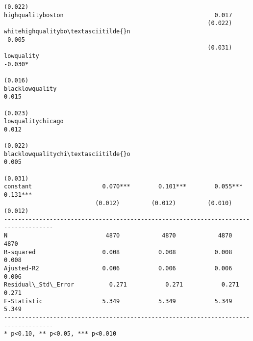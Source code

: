 \documentclass[11pt]{article}
\begin{document}
\begin{Verbatim}[commandchars=\\\{\}]
                                                          (0.022)                   
highqualityboston                                           0.017                   
                                                          (0.022)                   
whitehighqualitybo\textasciitilde{}n                                       -0.005                   
                                                          (0.031)                   
lowquality                                                                 -0.030*  
                                                                          (0.016)   
blacklowquality                                                             0.015   
                                                                          (0.023)   
lowqualitychicago                                                           0.012   
                                                                          (0.022)   
blacklowqualitychi\textasciitilde{}o                                                        0.005   
                                                                          (0.031)   
constant                    0.070***        0.101***        0.055***        0.131***
                          (0.012)         (0.012)         (0.010)         (0.012)   
------------------------------------------------------------------------------------
N                            4870            4870            4870            4870   
R-squared                   0.008           0.008           0.008           0.008   
Ajusted-R2                  0.006           0.006           0.006           0.006   
Residual\_Std\_Error          0.271           0.271           0.271           0.271   
F-Statistic                 5.349           5.349           5.349           5.349   
------------------------------------------------------------------------------------
* p<0.10, ** p<0.05, *** p<0.010

    \end{Verbatim}


    
    
    
    
\end{document}
